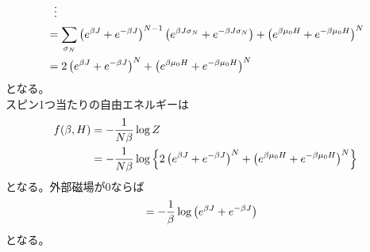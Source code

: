 \documentclass{jsarticle}  %
\numberwithin{equation}{section} %
\numberwithin{figure}{section}
\begin{document}
\begin{align}
        &\ \ \vdots \notag \\
        &= \sum_{\sigma_N} \left( e^{\beta J} + e^{-\beta J} \right)^{N-1} \left( e^{\beta J\sigma_{N}} + e^{-\beta J\sigma_{N}} \right) + \left( e^{\beta \mu_0 H} + e^{-\beta \mu_0 H}\right)^N \notag \\
        &= 2\left( e^{\beta J} + e^{-\beta J} \right)^N + \left( e^{\beta \mu_0 H} + e^{-\beta \mu_0 H}\right)^N
    \end{align}
    となる。\\
    スピン1つ当たりの自由エネルギーは
    \begin{align}
        f(\beta,H) &= -\frac{1}{N\beta} \log Z \notag \\
        &= -\frac{1}{N\beta} \log \left\{ 2\left( e^{\beta J} + e^{-\beta J} \right)^N +  \left( e^{\beta \mu_0 H} + e^{-\beta \mu_0 H}\right)^N\right\} 
    \end{align}
    となる。外部磁場が0ならば
    \begin{align}
        &= -\frac{1}{\beta} \log \left( e^{\beta J} + e^{-\beta J} \right) \notag 
    \end{align}
    となる。
\end{document}
